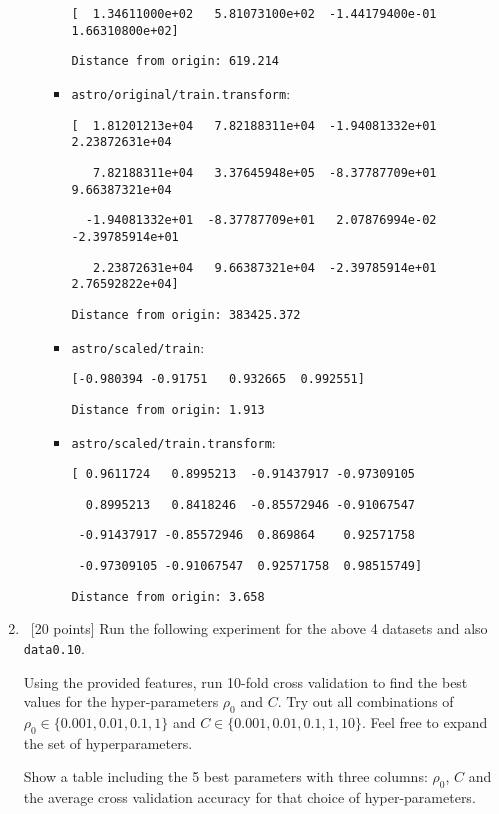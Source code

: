 \begin{enumerate}
\begin{itemize}
\begin{itemize}
    \verb~[  1.34611000e+02   5.81073100e+02  -1.44179400e-01   1.66310800e+02]~
    
    \verb~Distance from origin: 619.214~
  \item \verb~astro/original/train.transform~:

    \verb~[  1.81201213e+04   7.82188311e+04  -1.94081332e+01   2.23872631e+04~
    
    \verb~   7.82188311e+04   3.37645948e+05  -8.37787709e+01   9.66387321e+04~

    \verb~  -1.94081332e+01  -8.37787709e+01   2.07876994e-02  -2.39785914e+01~

    \verb~   2.23872631e+04   9.66387321e+04  -2.39785914e+01   2.76592822e+04]~
    
    \verb~Distance from origin: 383425.372~

    \item \verb~astro/scaled/train~:

    \verb~[-0.980394 -0.91751   0.932665  0.992551]~

    \verb~Distance from origin: 1.913~

    \item \verb~astro/scaled/train.transform~:
      
    \verb~[ 0.9611724   0.8995213  -0.91437917 -0.97309105~
    
    \verb~  0.8995213   0.8418246  -0.85572946 -0.91067547~

    \verb~ -0.91437917 -0.85572946  0.869864    0.92571758~

    \verb~ -0.97309105 -0.91067547  0.92571758  0.98515749]~

    \verb~Distance from origin: 3.658~
\end{itemize}
\end{itemize}

\item ~[20 points] Run the following experiment for the above 4
  datasets and also {\tt data0.10}.

  Using the provided features, run 10-fold cross validation to find
  the best values for the hyper-parameters $\rho_0$ and $C$. Try out
  all combinations of $\rho_0 \in \{0.001, 0.01, 0.1, 1\}$ and
  $C \in \{0.001, 0.01, 0.1, 1, 10\}$. Feel free to expand the set of
  hyperparameters.
  
  Show a table including the 5 best parameters with three columns:
  $\rho_0$, $C$ and the average cross validation accuracy for that
  choice of hyper-parameters.


\end{enumerate}
